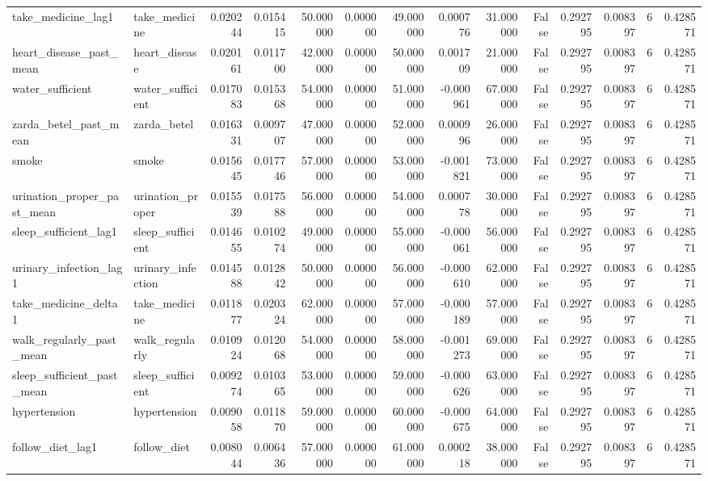 \begin{longtable}{llrrrrrrrrrrrr}
take\_medicine\_lag1 & take\_medicine & 0.020244 & 0.015415 & 50.000000 & 0.000000 & 49.000000 & 0.000776 & 31.000000 & False & 0.292795 & 0.008397 & 6 & 0.428571 \\
heart\_disease\_past\_mean & heart\_disease & 0.020161 & 0.011700 & 42.000000 & 0.000000 & 50.000000 & 0.001709 & 21.000000 & False & 0.292795 & 0.008397 & 6 & 0.428571 \\
water\_sufficient & water\_sufficient & 0.017083 & 0.015368 & 54.000000 & 0.000000 & 51.000000 & -0.000961 & 67.000000 & False & 0.292795 & 0.008397 & 6 & 0.428571 \\
zarda\_betel\_past\_mean & zarda\_betel & 0.016331 & 0.009707 & 47.000000 & 0.000000 & 52.000000 & 0.000996 & 26.000000 & False & 0.292795 & 0.008397 & 6 & 0.428571 \\
smoke & smoke & 0.015645 & 0.017746 & 57.000000 & 0.000000 & 53.000000 & -0.001821 & 73.000000 & False & 0.292795 & 0.008397 & 6 & 0.428571 \\
urination\_proper\_past\_mean & urination\_proper & 0.015539 & 0.017588 & 56.000000 & 0.000000 & 54.000000 & 0.000778 & 30.000000 & False & 0.292795 & 0.008397 & 6 & 0.428571 \\
sleep\_sufficient\_lag1 & sleep\_sufficient & 0.014655 & 0.010274 & 49.000000 & 0.000000 & 55.000000 & -0.000061 & 56.000000 & False & 0.292795 & 0.008397 & 6 & 0.428571 \\
urinary\_infection\_lag1 & urinary\_infection & 0.014588 & 0.012842 & 50.000000 & 0.000000 & 56.000000 & -0.000610 & 62.000000 & False & 0.292795 & 0.008397 & 6 & 0.428571 \\
take\_medicine\_delta1 & take\_medicine & 0.011877 & 0.020324 & 62.000000 & 0.000000 & 57.000000 & -0.000189 & 57.000000 & False & 0.292795 & 0.008397 & 6 & 0.428571 \\
walk\_regularly\_past\_mean & walk\_regularly & 0.010924 & 0.012068 & 54.000000 & 0.000000 & 58.000000 & -0.001273 & 69.000000 & False & 0.292795 & 0.008397 & 6 & 0.428571 \\
sleep\_sufficient\_past\_mean & sleep\_sufficient & 0.009274 & 0.010365 & 53.000000 & 0.000000 & 59.000000 & -0.000626 & 63.000000 & False & 0.292795 & 0.008397 & 6 & 0.428571 \\
hypertension & hypertension & 0.009058 & 0.011870 & 59.000000 & 0.000000 & 60.000000 & -0.000675 & 64.000000 & False & 0.292795 & 0.008397 & 6 & 0.428571 \\
follow\_diet\_lag1 & follow\_diet & 0.008044 & 0.006436 & 57.000000 & 0.000000 & 61.000000 & 0.000218 & 38.000000 & False & 0.292795 & 0.008397 & 6 & 0.428571 \\

\end{longtable}
